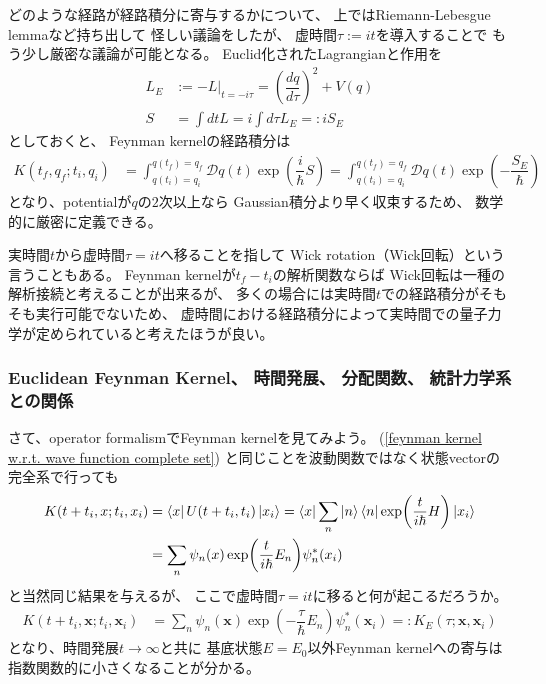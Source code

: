 どのような経路が経路積分に寄与するかについて、
上ではRiemann-Lebesgue lemmaなど持ち出して
怪しい議論をしたが、
虚時間$\tau := i t$を導入することで
もう少し厳密な議論が可能となる。
Euclid化されたLagrangianと作用を
\begin{subequations}
\begin{align}
    L_E
    &:=
    - L \Big|_{t = - i \tau}
    =
    \left(
        \dfrac{ d q }{ d \tau }
    \right)^2
    +
    V(q)
\\
    S
    &=
    \int dt L
    =
    i \int d\tau L_E
    =: i S_E
\end{align}
\end{subequations}
としておくと、
Feynman kernelの経路積分は
\begin{align}
    K( t_f, q_f ; t_i, q_i )
    &=
    \int_{q(t_i) = q_i}^{q(t_f) = q_f}
        \mathcal{D} q(t)
    \exp\left(
        \dfrac{i}{\hbar} S
    \right)
=
    \int_{q(t_i) = q_i}^{q(t_f) = q_f}
        \mathcal{D} q(t)
    \exp\left(
        -
        \dfrac{ S_E }{\hbar}
    \right)
\end{align}
となり、potentialが$q$の$2$次以上なら
Gaussian積分より早く収束するため、
数学的に厳密に定義できる。

実時間$t$から虚時間$\tau = i t$へ移ることを指して
Wick rotation（Wick回転）という言うこともある。
Feynman kernelが$t_f - t_i$の解析関数ならば
Wick回転は一種の解析接続と考えることが出来るが、
多くの場合には実時間$t$での経路積分がそもそも実行可能でないため、
虚時間における経路積分によって実時間での量子力学が定められていると考えたほうが良い。

\subsubsection{
    Euclidean Feynman Kernel、
    時間発展、
    分配関数、
    統計力学系との関係
}

さて、operator formalismでFeynman kernelを見てみよう。
(\ref{feynman kernel w.r.t. wave function complete set})
と同じことを波動関数ではなく状態vectorの完全系で行っても
\begin{align}
    K(t + t_i, x; t_i, x_i)
    &=
    \bra{ x }
        U (t + t_i, t_i)
    \ket{ x_i }
    =
    \bra{ x }
        \sum_n
            \ket{n}
            \bra{n}
        \exp(
            \dfrac{ t }{ i \hbar }
            H
        )
    \ket{ x_i }
\notag\\&
    =
    \sum_n
    \psi_n( x )
        \exp(
            \dfrac{ t }{ i \hbar }
            E_n
        )
    \psi_n^*( x_i )
\end{align}
と当然同じ結果を与えるが、
ここで虚時間$\tau = i t$に移ると何が起こるだろうか。
\begin{align}
    K(t + t_i, \bm{x}; t_i, \bm{x}_i)
    &=
    \sum_n
    \psi_n( \bm{x} )
        \exp(
            -
            \dfrac{ \tau }{ \hbar }
            E_n
        )
    \psi_n^*( \bm{x}_i )
    =:
    K_E ( \tau; \bm{x}, \bm{x}_i )
\end{align}
となり、時間発展$t \to \infty$と共に
基底状態$ E = E_0 $以外Feynman kernelへの寄与は
指数関数的に小さくなることが分かる。

